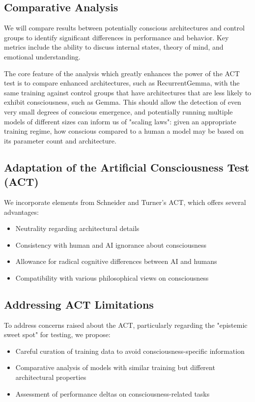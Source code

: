 \documentclass{article}
\begin{document}
\subsection{Comparative Analysis}
We will compare results between potentially conscious architectures and control groups to identify significant differences in performance and behavior. Key metrics include the ability to discuss internal states, theory of mind, and emotional understanding.

The core feature of the analysis which greatly enhances the power of the ACT test is to compare enhanced architectures, such as RecurrentGemma, with the same training against control groups that have architectures that are less likely to exhibit consciousness, such as Gemma. This should allow the detection of even very small degrees of conscious emergence, and potentially running multiple models of different sizes can inform us of "scaling laws": given an appropriate training regime, how conscious compared to a human a model may be based on its parameter count and architecture.


\subsection{Adaptation of the Artificial Consciousness Test (ACT)}
We incorporate elements from Schneider and Turner's ACT, which offers several advantages:
\begin{itemize}
    \item Neutrality regarding architectural details
    \item Consistency with human and AI ignorance about consciousness
    \item Allowance for radical cognitive differences between AI and humans
    \item Compatibility with various philosophical views on consciousness
\end{itemize}

\subsection{Addressing ACT Limitations}
To address concerns raised about the ACT, particularly regarding the "epistemic sweet spot" for testing, we propose:
\begin{itemize}
    \item Careful curation of training data to avoid consciousness-specific information
    \item Comparative analysis of models with similar training but different architectural properties
    \item Assessment of performance deltas on consciousness-related tasks
\end{itemize}
\end{document}
